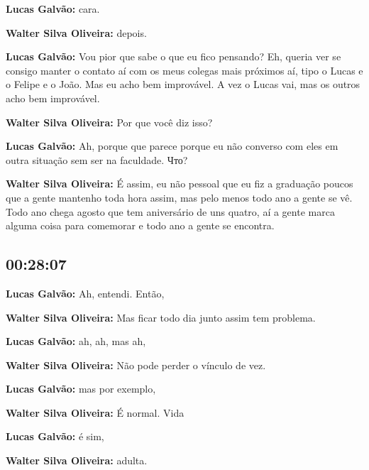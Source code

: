 \textbf{Lucas Galvão:} cara.



\textbf{Walter Silva Oliveira:} depois.



\textbf{Lucas Galvão:} Vou pior que sabe o que eu fico pensando? Eh, queria ver se consigo manter o contato aí com os meus colegas mais próximos aí, tipo o Lucas e o Felipe e o João. Mas eu acho bem improvável. A vez o Lucas vai, mas os outros acho bem improvável.



\textbf{Walter Silva Oliveira:} Por que você diz isso?



\textbf{Lucas Galvão:} Ah, porque que parece porque eu não converso com eles em outra situação sem ser na faculdade. Что?



\textbf{Walter Silva Oliveira:} É assim, eu não pessoal que eu fiz a graduação poucos que a gente mantenho toda hora assim, mas pelo menos todo ano a gente se vê. Todo ano chega agosto que tem aniversário de uns quatro, aí a gente marca alguma coisa para comemorar e todo ano a gente se encontra.



\subsection{\textbf{00:28:07}}



\textbf{Lucas Galvão:} Ah, entendi. Então,



\textbf{Walter Silva Oliveira:} Mas ficar todo dia junto assim tem problema.



\textbf{Lucas Galvão:} ah, ah, mas ah,



\textbf{Walter Silva Oliveira:} Não pode perder o vínculo de vez.



\textbf{Lucas Galvão:} mas por exemplo,



\textbf{Walter Silva Oliveira:} É normal. Vida



\textbf{Lucas Galvão:} é sim,



\textbf{Walter Silva Oliveira:} adulta.




